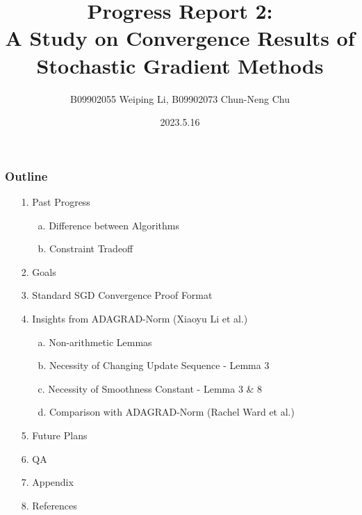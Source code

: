 \documentclass{beamer}
\title{Progress Report 2:\\A Study on Convergence Results of Stochastic Gradient Methods}
\author{B09902055 Weiping Li, B09902073 Chun-Neng Chu}
\date{2023.5.16}
\begin{document}
\frame{\titlepage}

\begin{frame}
\frametitle{Outline}
\begin{enumerate}
        \item [1.] Past Progress
            \begin{enumerate}
                 \item [a.] Difference between Algorithms
                 \item [b.] Constraint Tradeoff
            \end{enumerate}
        \item [2.] Goals
        \item [3.] Standard SGD Convergence Proof Format
        \item [4.] Insights from ADAGRAD-Norm (Xiaoyu Li et al.)
            \begin{enumerate}
                 \item [a.] Non-arithmetic Lemmas
                 \item [b.] Necessity of Changing Update Sequence - Lemma 3
                 \item [c.] Necessity of Smoothness Constant - Lemma 3 \& 8
                 \item [d.] Comparison with ADAGRAD-Norm (Rachel Ward et al.)
            \end{enumerate}
        \item [5.] Future Plans
        \item [6.] QA
        \item [7.] Appendix
        \item [8.] References
    \end{enumerate}
\end{frame}
\end{document}
